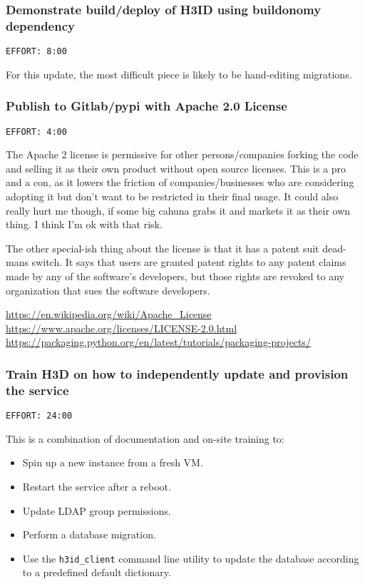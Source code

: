 \documentclass[11pt]{article}
\begin{document}
\subsubsection{Demonstrate build/deploy of H3ID using buildonomy dependency}
\label{sec:org92e225d}
\begin{verbatim}
EFFORT: 8:00
\end{verbatim}

For this update, the most difficult piece is likely to be hand-editing migrations.

\subsubsection{Publish to Gitlab/pypi with Apache 2.0 License}
\label{sec:org9d07dfa}
\begin{verbatim}
EFFORT: 4:00
\end{verbatim}

The Apache 2 license is permissive for other persons/companies forking the code and selling it as
their own product without open source licenses. This is a pro and a con, as it lowers the friction
of companies/businesses who are considering adopting it but don't want to be restricted in their
final usage. It could also really hurt me though, if some big cahuna grabs it and markets it as
their own thing. I think I'm ok with that risk.

The other special-ish thing about the license is that it has a patent suit dead-mans switch. It says
that users are granted patent rights to any patent claims made by any of the software's developers,
but those rights are revoked to any organization that sues the software developers.

\url{https://en.wikipedia.org/wiki/Apache\_License}
\url{https://www.apache.org/licenses/LICENSE-2.0.html}
\url{https://packaging.python.org/en/latest/tutorials/packaging-projects/}

\subsubsection{Train H3D on how to independently update and provision the service}
\label{sec:org95ded4d}
\begin{verbatim}
EFFORT: 24:00
\end{verbatim}

This is a combination of documentation and on-site training to:

\begin{itemize}
\item Spin up a new instance from a fresh VM.
\item Restart the service after a reboot.
\item Update LDAP group permissions.
\item Perform a database migration.
\item Use the \texttt{h3id\_client} command line utility to update the database according to a predefined
default dictionary.
\end{itemize}
\end{document}
